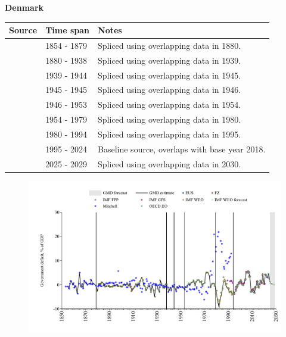 \documentclass[12pt,a4paper,landscape]{article}
\begin{document}
\begin{adjustbox}{max totalsize={\paperwidth}{\paperheight},center}
\begin{minipage}[t][\textheight][t]{\textwidth}
\vspace*{0.5cm}
{}
\begin{center}
{\Large\bfseries Denmark}
\end{center}
\vspace{0.5cm}
\begin{table}[H]
\centering
\small
\begin{tabular}{|l|l|l|}
\hline
\textbf{Source} & \textbf{Time span} & \textbf{Notes} \\
\hline
\rowcolor{white}\cite{Mitchell}& 1854 - 1879 &Spliced using overlapping data in 1880.\\
\rowcolor{lightgray}\cite{IMF_FPP}& 1880 - 1938 &Spliced using overlapping data in 1939.\\
\rowcolor{white}\cite{Mitchell}& 1939 - 1944 &Spliced using overlapping data in 1945.\\
\rowcolor{lightgray}\cite{IMF_FPP}& 1945 - 1945 &Spliced using overlapping data in 1946.\\
\rowcolor{white}\cite{Mitchell}& 1946 - 1953 &Spliced using overlapping data in 1954.\\
\rowcolor{lightgray}\cite{IMF_FPP}& 1954 - 1979 &Spliced using overlapping data in 1980.\\
\rowcolor{white}\cite{IMF_WEO}& 1980 - 1994 &Spliced using overlapping data in 1995.\\
\rowcolor{lightgray}\cite{EUS}& 1995 - 2024 &Baseline source, overlaps with base year 2018.\\
\rowcolor{white}\cite{IMF_WEO_forecast}& 2025 - 2029 &Spliced using overlapping data in 2030.\\
\hline
\end{tabular}
\end{table}
\begin{figure}[H]
\centering
\includegraphics[width=\textwidth,height=0.6\textheight,keepaspectratio]{graphs/DNK_govdef_GDP.pdf}
\end{figure}
\end{minipage}
\end{adjustbox}
\end{document}
